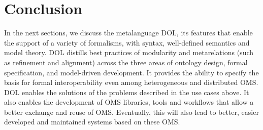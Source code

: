 \documentclass[10pt,%
\ifpretendfinal
final%
\else
draft%
\fi,
]{scrreprt}
\begin{document}
\section{Conclusion}

In the next sections, we discuss  the metalanguage DOL, its features that enable the support of a variety of formalisms, with syntax, well-defined semantics and model theory. DOL 
distills best practices of modularity and metarelations (such as refinement and alignment) across the three areas of ontology design, formal 
specification, and model-driven development. It provides the ability to specify the basis for formal interoperability even among heterogeneous and distributed OMS. DOL enables the solutions of the problems described in the use cases above. It also enables the development of OMS libraries, tools and workflows that 
allow  a better exchange and reuse of OMS. Eventually, this will also lead to better, easier developed and maintained systems based on these OMS.
\end{document}
